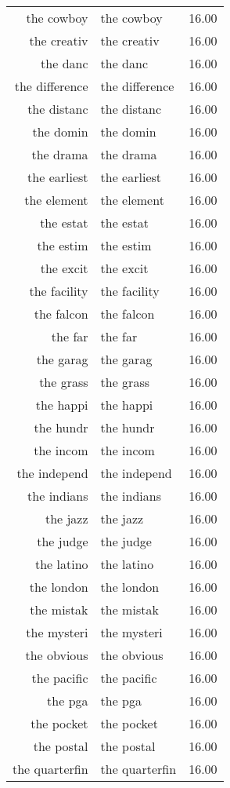 \begin{table}[ht]
\begin{tabular}{rlr}
  the cowboy & the cowboy & 16.00 \\ 
  the creativ & the creativ & 16.00 \\ 
  the danc & the danc & 16.00 \\ 
  the difference & the difference & 16.00 \\ 
  the distanc & the distanc & 16.00 \\ 
  the domin & the domin & 16.00 \\ 
  the drama & the drama & 16.00 \\ 
  the earliest & the earliest & 16.00 \\ 
  the element & the element & 16.00 \\ 
  the estat & the estat & 16.00 \\ 
  the estim & the estim & 16.00 \\ 
  the excit & the excit & 16.00 \\ 
  the facility & the facility & 16.00 \\ 
  the falcon & the falcon & 16.00 \\ 
  the far & the far & 16.00 \\ 
  the garag & the garag & 16.00 \\ 
  the grass & the grass & 16.00 \\ 
  the happi & the happi & 16.00 \\ 
  the hundr & the hundr & 16.00 \\ 
  the incom & the incom & 16.00 \\ 
  the independ & the independ & 16.00 \\ 
  the indians & the indians & 16.00 \\ 
  the jazz & the jazz & 16.00 \\ 
  the judge & the judge & 16.00 \\ 
  the latino & the latino & 16.00 \\ 
  the london & the london & 16.00 \\ 
  the mistak & the mistak & 16.00 \\ 
  the mysteri & the mysteri & 16.00 \\ 
  the obvious & the obvious & 16.00 \\ 
  the pacific & the pacific & 16.00 \\ 
  the pga & the pga & 16.00 \\ 
  the pocket & the pocket & 16.00 \\ 
  the postal & the postal & 16.00 \\ 
  the quarterfin & the quarterfin & 16.00 \\ 

\end{tabular}
\end{table}

